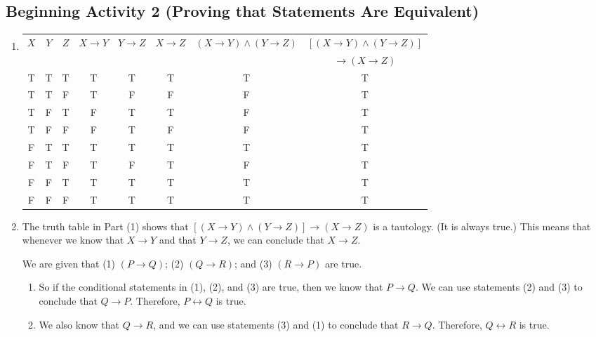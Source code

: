 \documentclass[11pt]{article}
\begin{document}
\newpage
\subsection*{Beginning Activity 2 (Proving that Statements Are Equivalent)}
\begin{enumerate}
\item 
\begin{tabular}[t]{| c | c | c || c | c | c | c | c | } \hline
$X$ & $Y$ & $Z$ &  $X \to Y$ & $Y \to Z$ & $X \to Z$ & $\left( {X \to Y} \right) \wedge \left( {Y \to Z} \right )$ & $\left[ {\left( {X \to Y} \right) \wedge \left( {Y \to Z} \right )} \right]$ \\ 
 & & & & & & & $\to \left( {X \to Z} \right)$ \\ \hline
T & T & T & T & T & T & T & T \\ \hline
T & T & F & T & F & F & F & T \\ \hline
T & F & T & F & T & T & F & T \\ \hline
T & F & F & F & T & F & F & T \\ \hline
F & T & T & T & T & T & T & T \\ \hline
F & T & F & T & F & T & F & T \\ \hline
F & F & T & T & T & T & T & T \\ \hline
F & F & F & T & T & T & T & T \\ \hline
\end{tabular}

\item The truth table in Part (1) shows that   
$\left[ {\left( {X \to Y} \right) \wedge \left( {Y \to Z} \right)} \right] \to \left( {X \to Z} \right)$  is a tautology.  (It is always true.)  This means that whenever we know that  $X \to Y$
  and that  $Y \to Z$, we can conclude that  $X \to Z$.

We are given that (1) $\left( {P \to Q} \right)$; (2) $\left( {Q \to R} \right)$; and  
(3) $\left( {R \to P} \right)$ are true.

\begin{enumerate}
\item So if the conditional statements in (1), (2), and (3) are true, then we know that  
$P \to Q$. We can use statements (2) and (3) to conclude that  $Q \to P$.  Therefore,  
$P \leftrightarrow Q$  is true.

\item We also know that  $Q \to R$, and we can use statements (3) and (1) to conclude that  
$R \to Q$.  Therefore,  $Q \leftrightarrow R$  is true.


\end{enumerate}
\end{enumerate}
\end{document}
